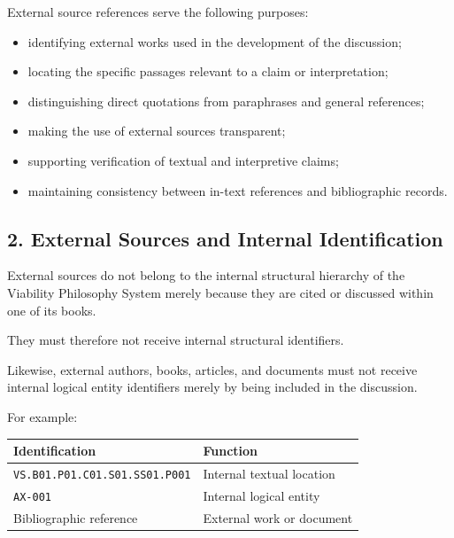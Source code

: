 External source references serve the following
purposes:

\begin{itemize}
    \item identifying external works used
    in the development of the discussion;
    \item locating the specific passages
    relevant to a claim or interpretation;
    \item distinguishing direct quotations
    from paraphrases and general references;
    \item making the use of external sources
    transparent;
    \item supporting verification of
    textual and interpretive claims;
    \item maintaining consistency between
    in-text references and bibliographic
    records.
\end{itemize}


\subsection*{2. External Sources and Internal
Identification}

External sources do not belong to the
internal structural hierarchy of the
Viability Philosophy System merely
because they are cited or discussed
within one of its books.

They must therefore not receive internal
structural identifiers.

Likewise, external authors, books,
articles, and documents must not
receive internal logical entity
identifiers merely by being included
in the discussion.

For example:

\begin{center}
\begin{tabular}{ll}
    \toprule
    \textbf{Identification} & \textbf{Function} \\
    \midrule
    \texttt{VS.B01.P01.C01.S01.SS01.P001}
        & Internal textual location \\
    \texttt{AX-001}
        & Internal logical entity \\
    Bibliographic reference
        & External work or document \\
    \bottomrule
\end{tabular}
\end{center}

